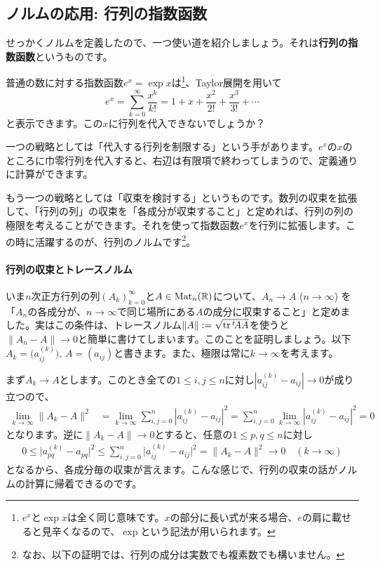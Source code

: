 \subsection{ノルムの応用: 行列の指数函数}

せっかくノルムを定義したので、一つ使い道を紹介しましょう。それは\textbf{行列の指数函数}というものです。

普通の数に対する指数函数$e^x = \exp x$は\footnote{$e^x$と$\exp x$は全く同じ意味です。$x$の部分に長い式が来る場合、$e$の肩に載せると見辛くなるので、$\exp$という記法が用いられます。}、Taylor展開を用いて
\[
e^x = \sum_{k = 0}^{\infty} \frac{x^k}{k!} = 1 + x + \frac{x^2}{2!} + \frac{x^3}{3!} + \cdots
\]
と表示できます。この$x$に行列を代入できないでしょうか？

一つの戦略としては「代入する行列を制限する」という手があります。$e^x$の$x$のところに巾零行列を代入すると、右辺は有限項で終わってしまうので、定義通りに計算ができます。

もう一つの戦略としては「収束を検討する」というものです。数列の収束を拡張して、「行列の列」の収束を「各成分が収束すること」と定めれば、行列の列の極限を考えることができます。それを使って指数函数$e^x$を行列に拡張します。この時に活躍するのが、行列のノルムです\footnote{なお、以下の証明では、行列の成分は実数でも複素数でも構いません。}。

\paragraph{行列の収束とトレースノルム}

いま$n$次正方行列の列$(A_k)_{k = 0}^{\infty}$と$A \in \operatorname{Mat}_n(\mathbb{R})$について、$A_n \rightarrow A$ ($n\rightarrow\infty$) を「$A_n$の各成分が、$n \rightarrow \infty$で同じ場所にある$A$の成分に収束すること」と定めました。実はこの条件は、トレースノルム$\|A\| := \sqrt{\operatorname{tr} {}^t\!A A}$を使うと$\|A_n - A\| \rightarrow 0$と簡単に書けてしまいます。このことを証明しましょう。以下$A_k = \bigl(a^{(k)}_{ij}\bigr)$, $A = (a_{ij})$と書きます。また、極限は常に$k \rightarrow \infty$を考えます。

まず$A_k \rightarrow A$とします。このとき全ての$1 \leq i, j \leq n$に対し$|a^{(k)}_{ij} - a_{ij}| \rightarrow 0$が成り立つので、
\begin{align*}
\lim_{k \rightarrow \infty} \|A_k - A\|^2
&= \lim_{k \rightarrow \infty} \sum_{i, j = 0}^n |a^{(k)}_{ij} - a_{ij}|^2 
= \sum_{i, j = 0}^n \lim_{k \rightarrow \infty} |a^{(k)}_{ij} - a_{ij}|^2 
= 0
\end{align*}
となります。逆に$\|A_k - A\| \rightarrow 0$とすると、任意の$1\leq p, q\leq n$に対し
\begin{align*}
0
\leq \bigl| a^{(k)}_{pq} - a_{pq} \bigr|^2
\leq \sum_{i, j = 0}^n \bigl| a^{(k)}_{ij} - a_{ij} \bigr|^2
= \|A_k - A\|^2
\rightarrow 0 \quad (k \rightarrow \infty)
\end{align*}
となるから、各成分毎の収束が言えます。こんな感じで、行列の収束の話がノルムの計算に帰着できるのです。


